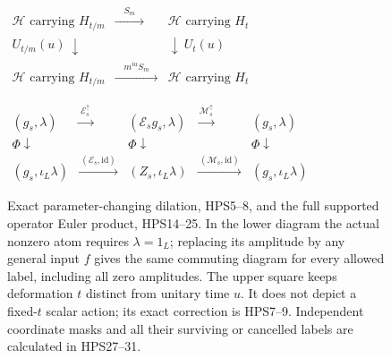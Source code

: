 \begin{figure}[ht]
\centering
$\begin{array}{ccc}
 \mathcal H\text{ carrying }H_{t/m}
       &\xrightarrow{\quad S_m\quad}
       &\mathcal H\text{ carrying }H_t\\
 U_{t/m}(u)\ \downarrow&&\downarrow\ U_t(u)\\
 \mathcal H\text{ carrying }H_{t/m}
       &\xrightarrow{\quad m^{iu}S_m\quad}
       &\mathcal H\text{ carrying }H_t
\end{array}$
\par\medskip
$\begin{array}{ccccc}
 (g_s,\lambda)&\xrightarrow{\ \mathcal E_s^\uparrow\ }&
 (\mathcal E_sg_s,\lambda)&
 \xrightarrow{\ \mathcal M_s^\uparrow\ }&(g_s,\lambda)\\
 \Phi\downarrow&&\Phi\downarrow&&\Phi\downarrow\\
 (g_s,\iota_L\lambda)&\xrightarrow{\ (\mathcal E_s,\mathrm{id})\ }&
 (Z_s,\iota_L\lambda)&
 \xrightarrow{\ (\mathcal M_s,\mathrm{id})\ }&(g_s,\iota_L\lambda)
\end{array}$
\caption{Exact parameter-changing dilation, HPS5--8,
and the full supported operator Euler product,
HPS14--25. In the lower diagram the actual nonzero
atom requires $\lambda=1_L$; replacing its
amplitude by any general input $f$ gives the
same commuting diagram for every allowed
label, including all zero amplitudes. The
upper square keeps deformation $t$ distinct
from unitary time $u$. It does not depict a
fixed-$t$ scalar action; its exact correction
is HPS7--9. Independent coordinate masks and
all their surviving or cancelled labels are
calculated in HPS27--31.}
\end{figure}
